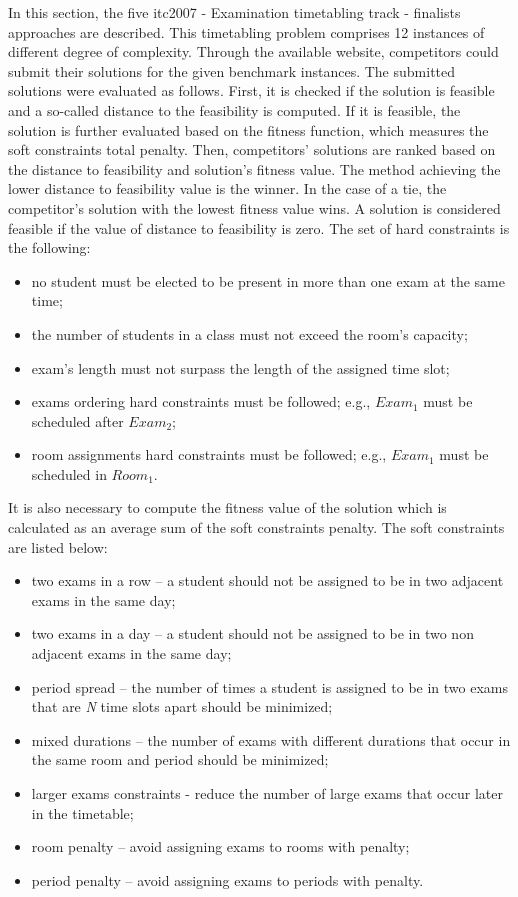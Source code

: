 In this section, the five \gls{itc2007} - Examination timetabling track - finalists approaches are described. This timetabling problem comprises 12 instances of different degree of complexity. Through the available website, competitors could submit their solutions for the given benchmark instances. The submitted solutions were evaluated as follows. First, it is checked if the solution is feasible and a so-called distance to the feasibility is computed. If it is feasible, the solution is further evaluated based on the fitness function, which measures the soft constraints total penalty. Then, competitors' solutions are ranked based on the distance to feasibility and solution's fitness value. The method achieving the lower distance to feasibility value is the winner. In the case of a tie, the competitor's solution with the lowest fitness value wins. A solution is considered feasible if the value of distance to feasibility is zero. The set of hard constraints is the following:
\begin{itemize}
	\item no student must be elected to be present in more than one exam at the same time;
	\item the number of students in a class must not exceed the room's capacity;
	\item exam's length must not surpass the length of the assigned time slot;
	\item exams ordering hard constraints must be followed; e.g., $Exam_1$ must be scheduled after $Exam_2$;
	\item room assignments hard constraints must be followed; e.g., 	$Exam_1$ must be scheduled in $Room_1$.
\end{itemize}
It is also necessary to compute the fitness value of the solution which is calculated as an average sum of the soft constraints penalty. The soft constraints are listed below:
\begin{itemize}
	\item two exams in a row -- a student should not be assigned to be in two adjacent exams in the same day;
	\item two exams in a day -- a student should not be assigned to be in two non adjacent exams in the same day;
	\item period spread -- the number of times a student is assigned to be in two exams that are \textit{N} time slots apart should be minimized;
	\item mixed durations -- the number of exams with different durations that occur in the same room and period should be minimized;
	\item larger exams constraints - reduce the number of large exams that occur later in the timetable;
	\item room penalty -- avoid assigning exams to rooms with penalty;
	\item period penalty -- avoid assigning exams to periods with penalty.
\end{itemize}
